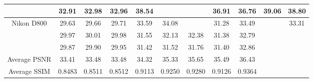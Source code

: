 \documentclass[10pt,twocolumn,letterpaper]{article}
\begin{document}
\begin{table}
\begin{center}
\begin{tabular}{|c||c|c|c|c|c|c|c|c|c|c|}
\cline{2-11}    
& 32.91 & 32.98 & 32.96 & 38.54 & \color{blue}{40.05} & \color{red}{40.59} & 36.91 & 36.76 & 39.06 & 38.80
\\
\hline
\multirow{3}{*}{Nikon D800} 
& 29.63 & 29.66 & 29.71 & 33.59 & 34.08 & \color{blue}{34.25} & 31.28 & 33.49 & \color{red}{34.61} & 33.31
\\ 
\cline{2-11} 
\multirow{3}{*}{ISO = 6400}   
& 29.97 & 30.01 & 29.98 & 31.55 & 32.13 & 32.38 & 31.38 & 32.79 & \color{red}{33.21} & \color{blue}{33.18}
\\ 
\cline{2-11}    
& 29.87 & 29.90 & 29.95 & 31.42 & 31.52 & 31.76 & 31.40 & 32.86 & \color{blue}{33.22} & \color{red}{33.35}
\\
\hline
Average PSNR & 33.41 & 33.48 & 33.48 & 34.32 & 35.33 & 35.65 & 35.49 & 36.43 & \color{blue}{36.88} & \color{red}{ 37.26}
\\
\hline
Average SSIM & 0.8483 & 0.8511 & 0.8512 & 0.9113 & 0.9250 & 0.9280 & 0.9126 & 0.9364 & \color{blue}{0.9481} & \color{red}{ 0.9505}
\\
\hline
\end{tabular}
\end{center}
\end{table}
\end{document}
